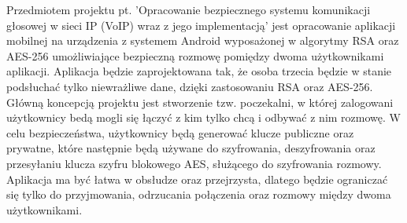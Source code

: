 Przedmiotem projektu pt. 'Opracowanie bezpiecznego systemu komunikacji głosowej w sieci IP (VoIP) wraz z jego implementacją' jest opracowanie aplikacji mobilnej na urządzenia z systemem Android wyposażonej w algorytmy RSA oraz AES-256 umożliwiające bezpieczną rozmowę pomiędzy dwoma użytkownikami aplikacji. Aplikacja będzie zaprojektowana tak, że osoba trzecia będzie w stanie podsłuchać tylko niewrażliwe dane, dzięki zastosowaniu RSA oraz AES-256. Główną koncepcją projektu jest stworzenie tzw. poczekalni, w której zalogowani użytkownicy bedą mogli się łączyć z kim tylko chcą i odbywać z nim rozmowę. W celu bezpieczeństwa, użytkownicy będą generować klucze publiczne oraz prywatne, które następnie będą używane do szyfrowania, deszyfrowania oraz przesyłaniu klucza szyfru blokowego AES, służącego do szyfrowania rozmowy. Aplikacja ma być łatwa w obsłudze oraz przejrzysta, dlatego będzie ograniczać się tylko do przyjmowania, odrzucania połączenia oraz rozmowy między dwoma użytkownikami.